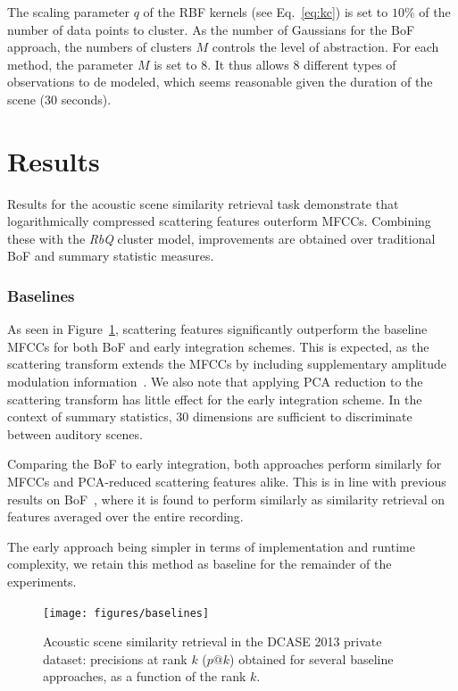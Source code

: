 \documentclass[smallextended]{svjour3}
\begin{document}
The scaling parameter $q$ of the RBF kernels (see Eq.~\ref{eq:kc}) is set to $10\%$ of the number of data points to cluster.  As the number of Gaussians for the BoF approach, the numbers of clusters $M$ controls the level of abstraction. For each method, the parameter $M$ is set to $8$. It thus allows $8$ different types of observations to de modeled, which seems reasonable given the duration of the scene (30 seconds).

\section{Results \label{sec:results}}

Results for the acoustic scene similarity retrieval task demonstrate that logarithmically compressed scattering features outerform MFCCs.
Combining these with the \emph{RbQ} cluster model, improvements are obtained over traditional BoF and summary statistic measures.

\subsubsection*{Baselines}

As seen in Figure~\ref{fig:ASS_-1}, scattering features significantly outperform the baseline MFCCs for both BoF and early integration schemes.
This is expected, as the scattering transform extends the MFCCs by including supplementary amplitude modulation information~\cite{Anden2014}.
We also note that applying PCA reduction to the scattering transform has little effect for the early integration scheme.
In the context of summary statistics, $30$ dimensions are sufficient to discriminate between auditory scenes.

Comparing the BoF to early integration, both approaches perform similarly for MFCCs and PCA-reduced scattering features alike.
This is in line with previous results on BoF~\cite{lagrange:hal-01082501}, where it is found to perform similarly as similarity retrieval on features averaged over the entire recording.

The early approach being simpler in terms of implementation and runtime complexity, we retain this method as baseline for the remainder of the experiments.

\begin{figure}[t]
\begin{center}
\texttt{[image: figures/baselines]}
\caption{Acoustic scene similarity retrieval in the DCASE 2013 private dataset: precisions at rank $k$ ($p@k$) obtained for several baseline approaches, as a function of the rank $k$.}
\label{fig:ASS_-1}
\end{center}
\end{figure}
\end{document}
